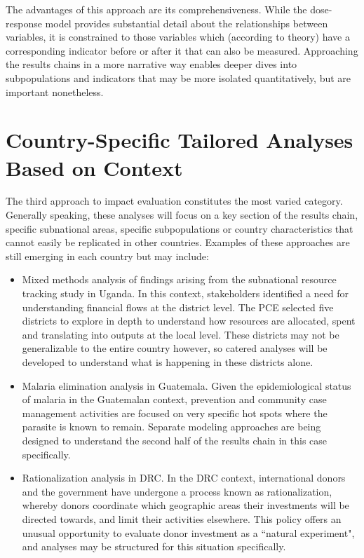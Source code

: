 \documentclass[twocolumn]{bmcart}%
\begin{document}
The advantages of this approach are its comprehensiveness. While the dose-response model provides substantial detail about the relationships between variables, it is constrained to those variables which (according to theory) have a corresponding indicator before or after it that can also be measured. Approaching the results chains in a more narrative way enables deeper dives into subpopulations and indicators that may be more isolated quantitatively, but are important nonetheless. \\

\section{Country-Specific Tailored Analyses Based on Context}

The third approach to impact evaluation constitutes the most varied category. Generally speaking, these analyses will focus on a key section of the results chain, specific subnational areas, specific subpopulations or country characteristics that cannot easily be replicated in other countries. Examples of these approaches are still emerging in each country but may include:

\begin{itemize}
  \item Mixed methods analysis of findings arising from the subnational resource tracking study in Uganda. In this context, stakeholders identified a need for understanding financial flows at the district level. The PCE selected five districts to explore in depth to understand how resources are allocated, spent and translating into outputs at the local level. These districts may not be generalizable to the entire country however, so catered analyses will be developed to understand what is happening in these districts alone.
  \item Malaria elimination analysis in Guatemala. Given the epidemiological status of malaria in the Guatemalan context, prevention and community case management activities are focused on very specific hot spots where the parasite is known to remain. Separate modeling approaches are being designed to understand the second half of the results chain in this case specifically.
  \item Rationalization analysis in DRC. In the DRC context, international donors and the government have undergone a process known as rationalization, whereby donors coordinate which geographic areas their investments will be directed towards, and limit their activities elsewhere. This policy offers an unusual opportunity to evaluate donor investment as a ``natural experiment", and analyses may be structured for this situation specifically.
\end{itemize}
\end{document}
